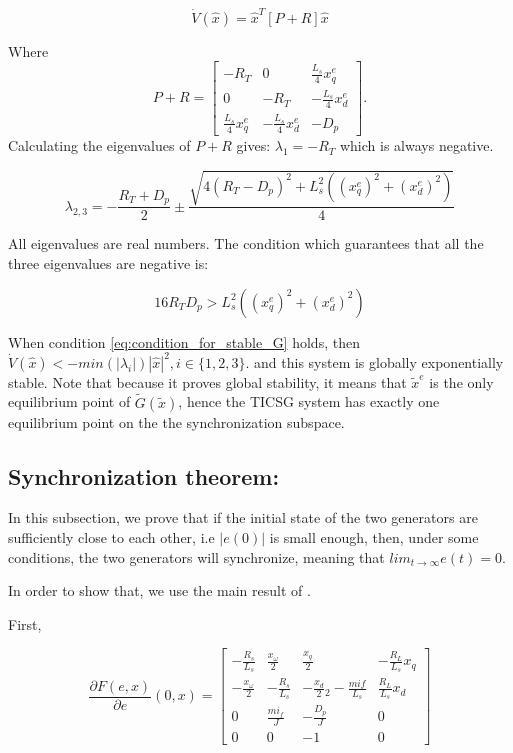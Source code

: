 \documentclass[conference]{IEEEtran}
\begin{document}
\[
\dot{V}(\hat{x})=\hat{x}^{T}\left[P+R\right]\hat{x}
\]

Where 
$$P+R=\left[\begin{array}{ccc}
-R_T & 0 & \frac{L_{s}}{4}x_{q}^{e}\\
0 & -R_T & -\frac{L_{s}}{4}x_{d}^{e}\\
\frac{L_{s}}{4}x_{q}^{e} & -\frac{L_{s}}{4}x_{d}^{e} & -D_{p}
\end{array}\right].$$
 Calculating the eigenvalues of $P+R$ gives:
 $\lambda_{1}=-R_T$
which is always negative. 

$$
\lambda_{2,3}=-\frac{R_T+D_{p}}{2} \pm\frac{\sqrt{4\left(R_T-D_{p}\right)^{2}+L_{s}^{2}\left(\left(x_{q}^{e}\right)^{2}+\left(x_{d}^{e}\right)^{2}\right)}}{4}
$$

All eigenvalues are real numbers. The condition which guarantees that all the three eigenvalues are negative is:

\begin{equation}
16 R_TD_{p}>L_{s}^{2}\left(\left(x_{q}^{e}\right)^{2}+\left(x_{d}^{e}\right)^{2}\right)\label{eq:condition_for_stable_G}
\end{equation}

When  condition \eqref{eq:condition_for_stable_G} holds, then $\dot{V}(\hat{x})<-min\left(\left|\lambda_{i}\right|\right)|\hat{x}|^{2},i\in\{1,2,3\}$.
and this system is globally exponentially stable. Note that because it proves global stability, it  means that $\tilde{x}^{e}$ is the only equilibrium point of $\tilde{G}(\tilde{x})$,
hence the TICSG system has exactly one equilibrium point on the the synchronization subspace.

\subsection{Synchronization theorem:}

In this subsection, we prove that if the initial state of the two generators
are sufficiently close to each other, i.e $|e(0)|$ is small enough, then, under some conditions, the two generators will synchronize, meaning that $lim_{t\to\infty}e(t)=0$.

In order to show that, we use the main result of \cite{AndrieuJayawardhanaPraly}.

First, 

\begin{equation}
\frac{\partial F(e,x)}{\partial e}(0,x)=\left[\begin{array}{cccc}
-\frac{R_{s}}{L_{s}} & \frac{x_{\omega}}{2} & \frac{x_{q}}{2} & -\frac{R_{L}}{L_{s}}x_{q}\\
-\frac{x_{\omega}}{2} & -\frac{R_{s}}{L_{s}} & -\frac{x_{d}}{2}{}_{2}-\frac{mif}{L_{s}} & \frac{R_{L}}{L_{s}}x_{d}\\
0 & \frac{mi_{f}}{J} & -\frac{D_{p}}{J} & 0\\
0 & 0 & -1 & 0
\end{array}\right]\label{eq:div_of_F}
\end{equation}
\end{document}
